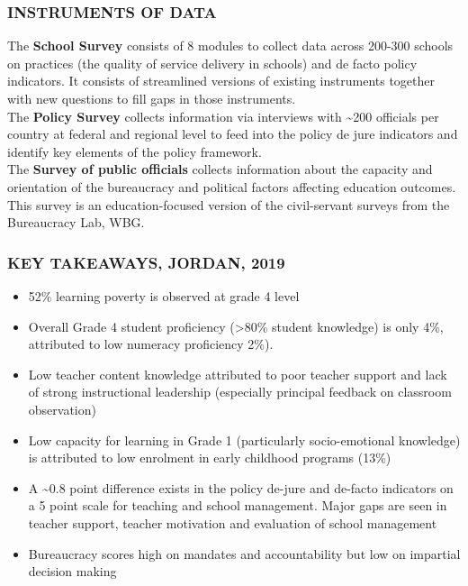 \documentclass[twocolumn]{article}
\providecommand{\tightlist}{%
  \setlength{\itemsep}{0pt}\setlength{\parskip}{0pt}}
\begin{document}
\hypertarget{instruments-of-data}{%
\subsubsection{\texorpdfstring{\textbf{INSTRUMENTS OF
DATA}}{INSTRUMENTS OF DATA}}\label{instruments-of-data}}

The \textbf{School Survey} consists of 8 modules to collect data across
200-300 schools on practices (the quality of service delivery in
schools) and de facto policy indicators. It consists of streamlined
versions of existing instruments together with new questions to fill
gaps in those instruments.\\
The \textbf{Policy Survey} collects information via interviews with
\textasciitilde{}200 officials per country at federal and regional level
to feed into the policy de jure indicators and identify key elements of
the policy framework.\\
The \textbf{Survey of public officials} collects information about the
capacity and orientation of the bureaucracy and political factors
affecting education outcomes. This survey is an education-focused
version of the civil-servant surveys from the Bureaucracy Lab, WBG.

\hypertarget{key-takeaways-jordan-2019}{%
\subsubsection{\texorpdfstring{\textbf{KEY TAKEAWAYS, JORDAN,
2019}}{KEY TAKEAWAYS, JORDAN, 2019}}\label{key-takeaways-jordan-2019}}

\begin{itemize}
\tightlist
\item
  52\% learning poverty is observed at grade 4 level
\item
  Overall Grade 4 student proficiency (\textgreater{}80\% student
  knowledge) is only 4\%, attributed to low numeracy proficiency 2\%).
\item
  Low teacher content knowledge attributed to poor teacher support and
  lack of strong instructional leadership (especially principal feedback
  on classroom observation)
\item
  Low capacity for learning in Grade 1 (particularly socio-emotional
  knowledge) is attributed to low enrolment in early childhood programs
  (13\%)
\item
  A \textasciitilde{}0.8 point difference exists in the policy de-jure
  and de-facto indicators on a 5 point scale for teaching and school
  management. Major gaps are seen in teacher support, teacher motivation
  and evaluation of school management
\item
  Bureaucracy scores high on mandates and accountability but low on
  impartial decision making
\end{itemize}
\end{document}
